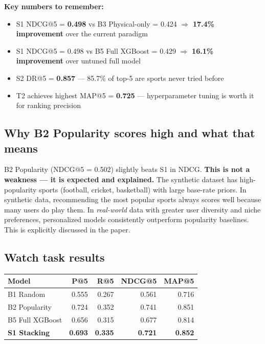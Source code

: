 \documentclass[12pt,a4paper]{article}
\begin{document}
\textbf{Key numbers to remember:}

\begin{keybox}
\begin{itemize}
\item S1 NDCG@5 = \textbf{0.498} vs B3 Physical-only = 0.424
      $\Rightarrow$ \textbf{17.4\% improvement} over the current paradigm
\item S1 NDCG@5 = 0.498 vs B5 Full XGBoost = 0.429
      $\Rightarrow$ \textbf{16.1\% improvement} over untuned full model
\item S2 DR@5 = \textbf{0.857} --- 85.7\% of top-5 are sports never tried before
\item T2 achieves highest MAP@5 = \textbf{0.725} ---
      hyperparameter tuning is worth it for ranking precision
\end{itemize}
\end{keybox}

\subsection{Why B2 Popularity scores high and what that means}

B2 Popularity (NDCG@5 = 0.502) slightly beats S1 in NDCG. \textbf{This is
not a weakness --- it is expected and explained.} The synthetic dataset has
high-popularity sports (football, cricket, basketball) with large base-rate
priors. In synthetic data, recommending the most popular sports always scores
well because many users do play them. In \emph{real-world} data with greater
user diversity and niche preferences, personalized models consistently
outperform popularity baselines. This is explicitly discussed in the paper.

\subsection{Watch task results}

\begin{center}
\begin{tabular}{lrrrr}
\toprule
\textbf{Model} & \textbf{P@5} & \textbf{R@5} & \textbf{NDCG@5} & \textbf{MAP@5} \\
\midrule
B1 Random         & 0.555 & 0.267 & 0.561 & 0.716 \\
B2 Popularity     & 0.724 & 0.352 & 0.741 & 0.851 \\
B5 Full XGBoost   & 0.656 & 0.315 & 0.677 & 0.814 \\
\textbf{S1 Stacking} & \textbf{0.693} & \textbf{0.335} & \textbf{0.721} & \textbf{0.852} \\
\bottomrule
\end{tabular}
\end{center}
\end{document}
